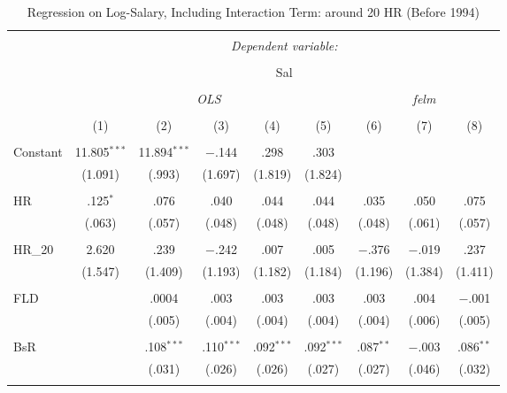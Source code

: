
\begin{table}[H] \centering
  \caption{Regression on Log-Salary, Including Interaction Term: around 20 HR (Before 1994)} 
  \label{HR20_B}
\tiny
\begin{tabular}{@{\extracolsep{5pt}}lcccccccc}
\\[-1.8ex]\hline
\hline \\[-1.8ex]
 & \multicolumn{8}{c}{\textit{Dependent variable:}} \\
\cline{2-9}
\\[-1.8ex] & \multicolumn{8}{c}{Sal} \\
\\[-1.8ex] & \multicolumn{5}{c}{\textit{OLS}} & \multicolumn{3}{c}{\textit{felm}} \\
\\[-1.8ex] & (1) & (2) & (3) & (4) & (5) & (6) & (7) & (8)\\
\hline \\[-1.8ex]
 Constant & 11.805$^{***}$ & 11.894$^{***}$ & $-$.144 & .298 & .303 &  &  &  \\
  & (1.091) & (.993) & (1.697) & (1.819) & (1.824) &  &  &  \\
  & & & & & & & & \\
 HR & .125$^{*}$ & .076 & .040 & .044 & .044 & .035 & .050 & .075 \\
  & (.063) & (.057) & (.048) & (.048) & (.048) & (.048) & (.061) & (.057) \\
  & & & & & & & & \\
 HR\_20 & 2.620 & .239 & $-$.242 & .007 & .005 & $-$.376 & $-$.019 & .237 \\
  & (1.547) & (1.409) & (1.193) & (1.182) & (1.184) & (1.196) & (1.384) & (1.411) \\
  & & & & & & & & \\
 FLD &  & .0004 & .003 & .003 & .003 & .003 & .004 & $-$.001 \\
  &  & (.005) & (.004) & (.004) & (.004) & (.004) & (.006) & (.005) \\
  & & & & & & & & \\
 BsR &  & .108$^{***}$ & .110$^{***}$ & .092$^{***}$ & .092$^{***}$ & .087$^{**}$ & $-$.003 & .086$^{**}$ \\
  &  & (.031) & (.026) & (.026) & (.027) & (.027) & (.046) & (.032) \\
  & & & & & & & & \\

\end{tabular}
\end{table}
